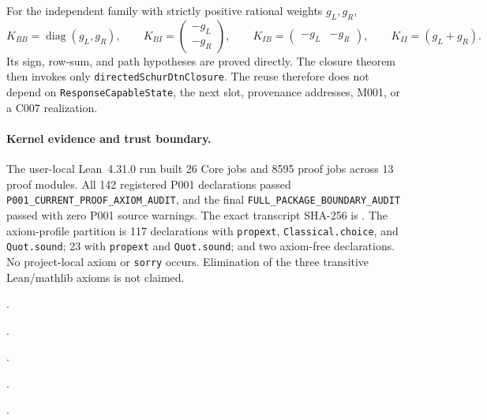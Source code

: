 For the independent family with strictly positive rational weights $g_L,g_R$,
\[
K_{BB}=\operatorname{diag}(g_L,g_R),\qquad
K_{BI}=\begin{pmatrix}-g_L\\-g_R\end{pmatrix},\qquad
K_{IB}=\begin{pmatrix}-g_L&-g_R\end{pmatrix},\qquad
K_{II}=(g_L+g_R).
\]
Its sign, row-sum, and path hypotheses are proved directly.  The closure theorem
then invokes only \texttt{directedSchurDtnClosure}.  The reuse therefore does
not depend on \texttt{ResponseCapableState}, the next slot, provenance
addresses, M001, or a C007 realization.

\paragraph*{Kernel evidence and trust boundary.}
The user-local Lean~4.31.0 run built 26 Core jobs and 8595 proof jobs across 13
proof modules.  All 142 registered P001 declarations passed
\texttt{P001\_CURRENT\_PROOF\_AXIOM\_AUDIT}, and the final
\texttt{FULL\_PACKAGE\_BOUNDARY\_AUDIT} passed with zero P001 source
warnings.  The exact transcript SHA-256 is
\texttt{}.  The axiom-profile partition is 117
declarations with \texttt{propext}, \texttt{Classical.choice}, and
\texttt{Quot.sound}; 23 with \texttt{propext} and \texttt{Quot.sound};
and two axiom-free declarations.  No project-local axiom or \texttt{sorry}
occurs.  Elimination of the three transitive Lean/mathlib axioms is not claimed.

\cite[Subsingleton.elim declaration; Lean 4.31.0 Init.Core]{LeanInitCore431}.

\cite[rational constructor and arithmetic lemmas]{LeanRatLemmas431}.

\cite[finite-fold recursion equations]{LeanFinFold431}.

\cite[finite-sum recursion equations]{MathlibBigOperatorsFinFabf563a}.

\cite[rectangular row-by-column multiplication definition]{MathlibMatrixMulFabf563a}.

